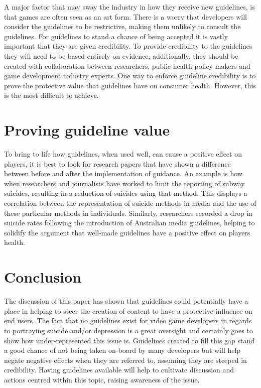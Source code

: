 \documentclass{scrartcl}
\begin{document}
		A major factor that may sway the industry in how they receive new guidelines, is that games are often seen as an art form\cite{pearce2006games}. There is a worry that developers will consider the guidelines to be restrictive, making them unlikely to consult the guidelines. For guidelines to stand a chance of being accepted it is vastly important that they are given credibility. To provide credibility to the guidelines they will need to be based entirely on evidence, additionally, they should be created with collaboration between researchers, public health policy-makers and game development industry experts\cite{hawton2002influences}. One way to enforce guideline credibility is to prove the protective value that guidelines have on consumer health. However, this is the most difficult to achieve.
		
	\section{Proving guideline value}
		To bring to life how guidelines, when used well, can cause a positive effect on players, it is best to look for research papers that have shown a difference between before and after the implementation of guidance.
		An example is how when researchers and journalists have worked to limit the reporting of subway suicides, resulting in a reduction of suicides using that method\cite{etzersdorfer1998preventing}. This displays a correlation between the representation of suicide methods in media and the use of these particular methods in individuals.
		Similarly, researchers recorded a drop in suicide rates following the introduction of Australian media guidelines\cite{niederkrotenthaler2007assessing}, helping to solidify the argument that well-made guidelines have a positive effect on players health. 
		
	\section{Conclusion}
		The discussion of this paper has shown that guidelines could potentially have a place in helping to steer the creation of content to have a protective influence on end users. The fact that no guidelines exist for video game developers in regards to portraying suicide and/or depression is a great oversight and certainly goes to show how under-represented this issue is. 
		Guidelines created to fill this gap stand a good chance of not being taken on-board by many developers but will help negate negative effects when they are referred to, assuming they are steeped in credibility. Having guidelines available will help to cultivate discussion and actions centred within this topic, raising awareness of the issue.
		
		
	
	
	
\end{document}
